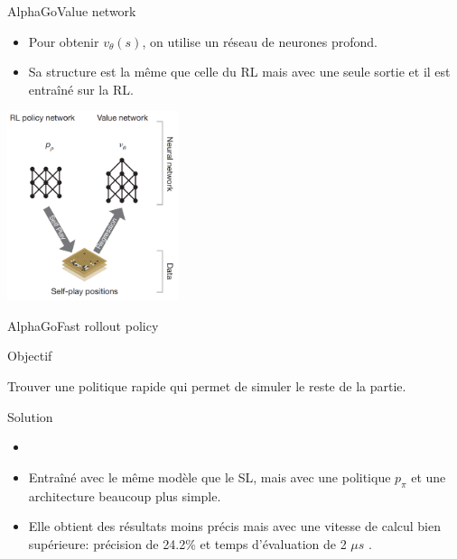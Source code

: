 \begin{frame}{AlphaGo}{Value network}
    \begin{itemize}
        \item Pour obtenir $v_\theta(s)$, on utilise un réseau de neurones profond.
        \item Sa structure est la même que celle du RL mais avec une seule sortie et il est entraîné sur la RL.
    \end{itemize}
    \begin{center}
        \includegraphics[width=5cm]{ressources/AlphaGo/RL_and_VN}
    \end{center}
\end{frame}

\begin{frame}{AlphaGo}{Fast rollout policy}
    \begin{block}{Objectif}
        \begin{center}
            Trouver une politique rapide qui permet de simuler le reste de la partie.
        \end{center}
    \end{block}
    \begin{block}{Solution}
        \begin{itemize}
            \item
            \item Entraîné avec le même modèle que le SL, mais avec une politique $p_\pi$ et une architecture beaucoup plus simple.
            \item Elle obtient des résultats moins précis mais avec une vitesse de calcul bien supérieure: précision de 24.2\% et temps d'évaluation de 2 $\mu s$ .
        \end{itemize}
    \end{block}
\end{frame}


